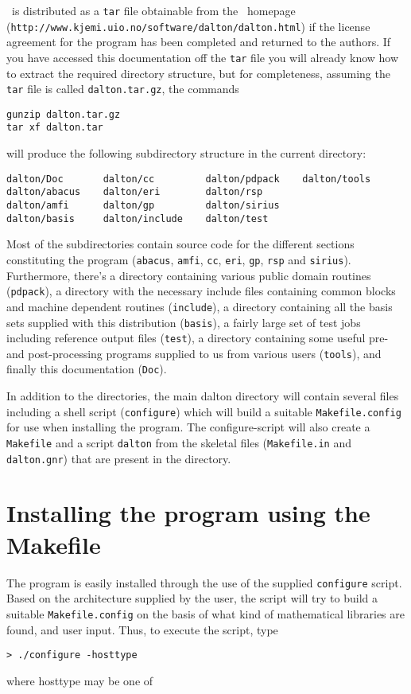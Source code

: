 \dalton\ is distributed as a \verb|tar| file obtainable from
the \dalton\ homepage\\
(\verb|http://www.kjemi.uio.no/software/dalton/dalton.html|) if the
license agreement for the program has been completed and returned to
the authors.  If you have accessed this documentation off the
\verb|tar| file you will
already know how to extract the required directory structure, but
for completeness, assuming the \verb|tar| file is called
\verb|dalton.tar.gz|, the commands
\begin{verbatim}
gunzip dalton.tar.gz
tar xf dalton.tar
\end{verbatim}
will produce the following subdirectory structure in the current
directory:
\begin{verbatim}
dalton/Doc       dalton/cc         dalton/pdpack    dalton/tools
dalton/abacus    dalton/eri        dalton/rsp
dalton/amfi      dalton/gp         dalton/sirius
dalton/basis     dalton/include    dalton/test
\end{verbatim}
Most of the subdirectories contain source code for the different sections
constituting the program (\verb|abacus|, \verb|amfi|, \verb|cc|,
\verb|eri|, \verb|gp|, \verb|rsp| and \verb|sirius|). Furthermore,
there's a directory containing
various public domain routines (\verb|pdpack|), a directory with the
necessary include files containing common blocks and
machine dependent routines (\verb|include|), a directory containing
all the basis sets supplied with this distribution (\verb|basis|), a
fairly large set of test jobs including reference output files
(\verb|test|), a directory containing some useful pre- and
post-processing programs supplied to us from various users
(\verb|tools|), and finally this documentation (\verb|Doc|). 

In addition to the directories, the main dalton directory will
contain several files including a shell script (\verb|configure|)
which will build a suitable \verb|Makefile.config| for use when
installing the program. The configure-script will also create a
\verb|Makefile| and a script \verb|dalton| from the skeletal files
(\verb|Makefile.in| and \verb|dalton.gnr|) that are present in the
directory.


\section{Installing the program using the
Makefile}\label{sec:Makefile}

The program is easily installed through the use of the supplied
\verb|configure| script. Based on the
architecture supplied by the user, the
script will try to build a suitable
\verb|Makefile.config| on the
basis of what kind of mathematical libraries are found, and user
input. Thus, to execute the script, type
\begin{verbatim}
> ./configure -hosttype
\end{verbatim}
where hosttype may be one of


